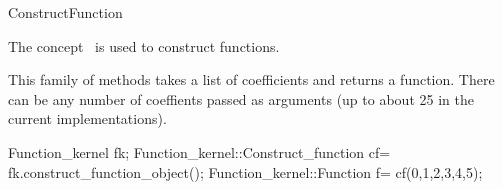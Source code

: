 
\begin{ccRefConcept}{ConstructFunction}


\ccDefinition
  
The concept \ccClassName\ is used to construct functions. 


\ccOperations

 {This family of methods
  takes a list of coefficients and returns a function. There can be
  any number of coeffients passed as arguments (up to about 25 in the
  current implementations).}

\ccSeeAlso


\ccExample

\begin{ccExampleCode}
Function_kernel fk;
Function_kernel::Construct_function cf= fk.construct_function_object();
Function_kernel::Function f= cf(0,1,2,3,4,5);
\end{ccExampleCode}

\end{ccRefConcept}




